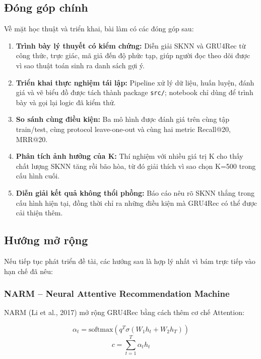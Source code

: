 \documentclass[12pt, a4paper]{article}
\begin{document}
\subsection{Đóng góp chính}

Về mặt học thuật và triển khai, bài làm có các đóng góp sau:

\begin{enumerate}
    \item \textbf{Trình bày lý thuyết có kiểm chứng:} Diễn giải SKNN và GRU4Rec từ công thức, trực giác, mã giả đến độ phức tạp, giúp người đọc theo dõi được vì sao thuật toán sinh ra danh sách gợi ý.

    \item \textbf{Triển khai thực nghiệm tái lập:} Pipeline xử lý dữ liệu, huấn luyện, đánh giá và vẽ biểu đồ được tách thành package \texttt{src/}; notebook chỉ dùng để trình bày và gọi lại logic đã kiểm thử.

    \item \textbf{So sánh cùng điều kiện:} Ba mô hình được đánh giá trên cùng tập train/test, cùng protocol leave-one-out và cùng hai metric Recall@20, MRR@20.

    \item \textbf{Phân tích ảnh hưởng của K:} Thí nghiệm với nhiều giá trị K cho thấy chất lượng SKNN tăng rồi bão hòa, từ đó giải thích vì sao chọn K=500 trong cấu hình cuối.

    \item \textbf{Diễn giải kết quả không thổi phồng:} Báo cáo nêu rõ SKNN thắng trong cấu hình hiện tại, đồng thời chỉ ra những điều kiện mà GRU4Rec có thể được cải thiện thêm.
\end{enumerate}

\subsection{Hướng mở rộng}

Nếu tiếp tục phát triển đề tài, các hướng sau là hợp lý nhất vì bám trực tiếp vào hạn chế đã nêu:

\subsubsection{NARM -- Neural Attentive Recommendation Machine}

NARM (Li et al., 2017) \cite{li2017} mở rộng GRU4Rec bằng cách thêm cơ chế Attention:

\begin{equation}
    \alpha_t = \text{softmax}(q^T \sigma(W_1 h_t + W_2 h_T))
\end{equation}
\begin{equation}
    c = \sum_{t=1}^{T} \alpha_t h_t
\end{equation}
\end{document}
